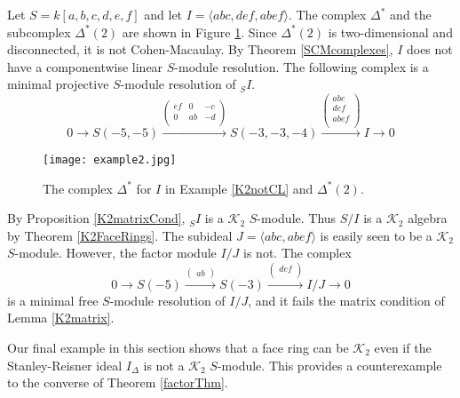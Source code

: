 \documentclass[11pt,righttag]{amsart}
\begin{document}
\begin{example}
\label{K2notCL}
Let $S=k[a,b,c,d,e,f]$ and let $I={\langle} abc, def, abef{\rangle}$. The complex ${\Delta}^*$ and the subcomplex ${\Delta}^*(2)$ are shown in Figure \ref{K2notCLfig}. Since ${\Delta}^*(2)$ is two-dimensional and disconnected, it is not Cohen-Macaulay.
By Theorem \ref{SCMcomplexes}, $I$ does not have a componentwise linear $S$-module resolution. The following complex is a minimal projective $S$-module resolution of $_SI$.
$$0\rightarrow S(-5,-5)\xrightarrow{\begin{pmatrix}  ef & 0 &-c\\  0 & ab & -d\\ \end{pmatrix}}S(-3,-3,-4)\xrightarrow{\begin{pmatrix} abc\\def\\abef\\ \end{pmatrix}} I\rightarrow 0$$

\begin{figure}[ht] 
   \centering
   \texttt{[image: example2.jpg]} 
   \caption{The complex ${\Delta}^*$ for $I$ in Example \ref{K2notCL}  and ${\Delta}^*(2)$.}
      \label{K2notCLfig}
\end{figure}
By Proposition \ref{K2matrixCond}, $_SI$ is a ${{\mathcal K}}_2$ $S$-module. Thus $S/I$ is a ${{\mathcal K}}_2$ algebra by Theorem \ref{K2FaceRings}.
The subideal $J={\langle} abc, abef{\rangle}$ is easily seen to be a ${{\mathcal K}}_2$ $S$-module. However, the factor module $I/J$ is not. The complex
$$0\rightarrow S(-5)\xrightarrow{\begin{pmatrix}ab\end{pmatrix}}S(-3)\xrightarrow{\begin{pmatrix}def\\ \end{pmatrix}}I/J\rightarrow 0$$
is a minimal free $S$-module resolution of $I/J$, and it  fails the matrix condition of Lemma \ref{K2matrix}.
\end{example}

Our final example in this section shows that a face ring can be ${{\mathcal K}}_2$ even if the Stanley-Reisner ideal $I_{\Delta}$ is not a ${{\mathcal K}}_2$ $S$-module. This provides a counterexample to the converse of Theorem \ref{factorThm}.
\end{document}
